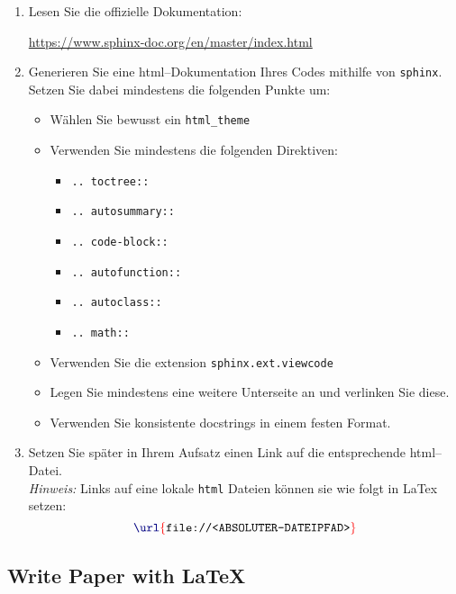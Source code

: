 	\begin{enumerate}
		\item Lesen Sie die offizielle	Dokumentation:

			\url{https://www.sphinx-doc.org/en/master/index.html}

		\item Generieren Sie eine html--Dokumentation Ihres Codes mithilfe von \texttt{sphinx}. Setzen Sie dabei mindestens die folgenden Punkte um:
		\begin{itemize}
			\item Wählen Sie bewusst ein \texttt{html\_theme}
			\item Verwenden Sie mindestens die folgenden Direktiven:
			\begin{itemize}
				\item \texttt{.. toctree::}
				\item \texttt{.. autosummary::}
				\item \texttt{.. code-block::}
				\item \texttt{.. autofunction::}
				\item \texttt{.. autoclass::}
				\item \texttt{.. math::}
			\end{itemize}
			\item Verwenden Sie die extension \texttt{sphinx.ext.viewcode}
			\item Legen Sie mindestens eine weitere Unterseite an und verlinken Sie diese.
			\item Verwenden Sie konsistente docstrings in einem festen Format.
		\end{itemize}
		\item Setzen Sie später in Ihrem Aufsatz einen Link auf die entsprechende html--Datei. \\
		\textit{Hinweis:} Links auf eine lokale \texttt{html} Dateien können sie wie folgt in LaTex setzen: $$\latexCommand{url}{file://<ABSOLUTER-DATEIPFAD>}$$
	\end{enumerate}


\subsection{Write Paper with \LaTeX}


